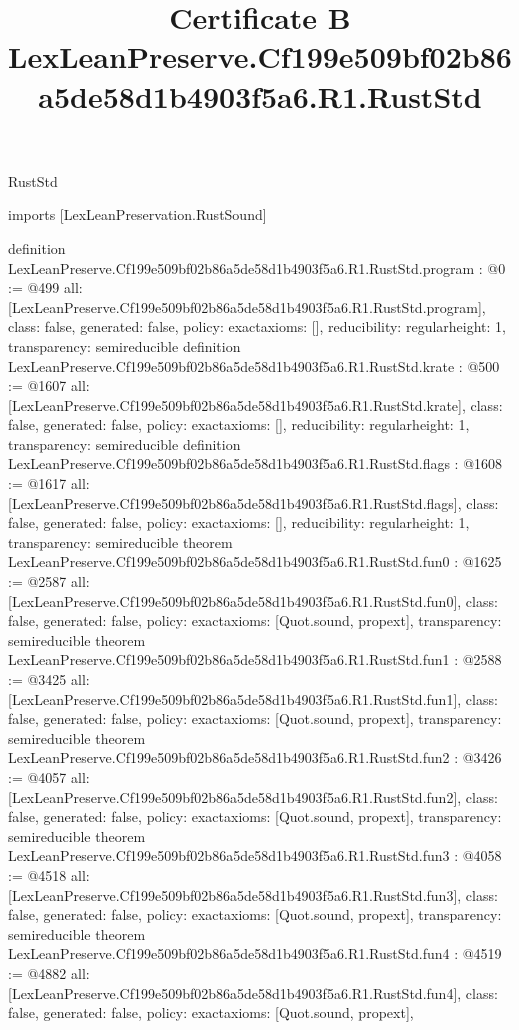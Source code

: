 \begin{lexlean}{RustStd}
\title{Certificate B LexLeanPreserve.Cf199e509bf02b86a5de58d1b4903f5a6.R1.RustStd}
\begin{coremodule}
imports [LexLeanPreservation.RustSound]

definition LexLeanPreserve.Cf199e509bf02b86a5de58d1b4903f5a6.R1.RustStd.program : @0 := @499 {
  all: [LexLeanPreserve.Cf199e509bf02b86a5de58d1b4903f5a6.R1.RustStd.program],
  class: false,
  generated: false,
  policy: exact{axioms: []},
  reducibility: regular{height: 1},
  transparency: semireducible
}
definition LexLeanPreserve.Cf199e509bf02b86a5de58d1b4903f5a6.R1.RustStd.krate : @500 := @1607 {
  all: [LexLeanPreserve.Cf199e509bf02b86a5de58d1b4903f5a6.R1.RustStd.krate],
  class: false,
  generated: false,
  policy: exact{axioms: []},
  reducibility: regular{height: 1},
  transparency: semireducible
}
definition LexLeanPreserve.Cf199e509bf02b86a5de58d1b4903f5a6.R1.RustStd.flags : @1608 := @1617 {
  all: [LexLeanPreserve.Cf199e509bf02b86a5de58d1b4903f5a6.R1.RustStd.flags],
  class: false,
  generated: false,
  policy: exact{axioms: []},
  reducibility: regular{height: 1},
  transparency: semireducible
}
theorem LexLeanPreserve.Cf199e509bf02b86a5de58d1b4903f5a6.R1.RustStd.fun0 : @1625 := @2587 {
  all: [LexLeanPreserve.Cf199e509bf02b86a5de58d1b4903f5a6.R1.RustStd.fun0],
  class: false,
  generated: false,
  policy: exact{axioms: [Quot.sound, propext]},
  transparency: semireducible
}
theorem LexLeanPreserve.Cf199e509bf02b86a5de58d1b4903f5a6.R1.RustStd.fun1 : @2588 := @3425 {
  all: [LexLeanPreserve.Cf199e509bf02b86a5de58d1b4903f5a6.R1.RustStd.fun1],
  class: false,
  generated: false,
  policy: exact{axioms: [Quot.sound, propext]},
  transparency: semireducible
}
theorem LexLeanPreserve.Cf199e509bf02b86a5de58d1b4903f5a6.R1.RustStd.fun2 : @3426 := @4057 {
  all: [LexLeanPreserve.Cf199e509bf02b86a5de58d1b4903f5a6.R1.RustStd.fun2],
  class: false,
  generated: false,
  policy: exact{axioms: [Quot.sound, propext]},
  transparency: semireducible
}
theorem LexLeanPreserve.Cf199e509bf02b86a5de58d1b4903f5a6.R1.RustStd.fun3 : @4058 := @4518 {
  all: [LexLeanPreserve.Cf199e509bf02b86a5de58d1b4903f5a6.R1.RustStd.fun3],
  class: false,
  generated: false,
  policy: exact{axioms: [Quot.sound, propext]},
  transparency: semireducible
}
theorem LexLeanPreserve.Cf199e509bf02b86a5de58d1b4903f5a6.R1.RustStd.fun4 : @4519 := @4882 {
  all: [LexLeanPreserve.Cf199e509bf02b86a5de58d1b4903f5a6.R1.RustStd.fun4],
  class: false,
  generated: false,
  policy: exact{axioms: [Quot.sound, propext]},
}
\end{coremodule}
\end{lexlean}
